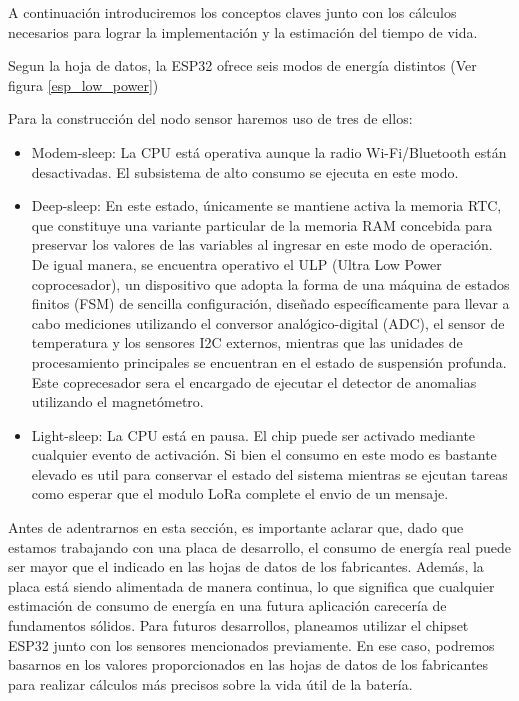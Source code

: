 A continuación introduciremos los conceptos claves junto con los cálculos necesarios
para lograr la implementación y la estimación del tiempo de vida.

Segun la hoja de datos, la ESP32 ofrece seis modos de energía distintos (Ver figura \ref{esp_low_power})


Para la construcción del nodo sensor haremos uso de tres de ellos:
\begin{itemize}
    \item Modem-sleep: La CPU está operativa aunque la radio Wi-Fi/Bluetooth están desactivadas. El subsistema de alto consumo se ejecuta en este modo.
    \item Deep-sleep: En este estado, únicamente se mantiene activa la memoria RTC, que constituye una variante particular de la memoria RAM concebida para preservar los valores de las variables al ingresar en este modo de operación. De igual manera, se encuentra operativo el ULP (Ultra Low Power coprocesador), un dispositivo que adopta la forma de una máquina de estados finitos (FSM) de sencilla configuración, diseñado específicamente para llevar a cabo mediciones utilizando el conversor analógico-digital (ADC), el sensor de temperatura y los sensores I2C externos, mientras que las unidades de procesamiento principales se encuentran en el estado de suspensión profunda. Este coprecesador sera el encargado de ejecutar el detector de anomalias utilizando el magnetómetro.
    \item Light-sleep: La CPU está en pausa. El chip puede ser activado mediante cualquier evento de activación. Si bien el consumo en este modo es bastante elevado es util para conservar el estado del sistema mientras se ejcutan tareas como esperar que el modulo LoRa complete el envio de un mensaje.
\end{itemize}



Antes de adentrarnos en esta sección, es importante aclarar que, dado que estamos trabajando con una placa de desarrollo, el consumo de energía real puede ser mayor que el indicado en las hojas de datos de los fabricantes. Además, la placa está siendo alimentada de manera continua, lo que significa que cualquier estimación de consumo de energía en una futura aplicación carecería de fundamentos sólidos. Para futuros desarrollos, planeamos utilizar el chipset ESP32 junto con los sensores mencionados previamente. En ese caso, podremos basarnos en los valores proporcionados en las hojas de datos de los fabricantes para realizar cálculos más precisos sobre la vida útil de la batería.

